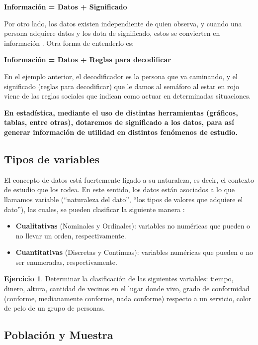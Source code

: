 \documentclass[
  11pt,
]{book}
\providecommand{\tightlist}{%
  \setlength{\itemsep}{0pt}\setlength{\parskip}{0pt}}
\theoremstyle{definition}
\theoremstyle{definition}
\theoremstyle{definition}
\newtheorem{exercise}{Ejercicio}[chapter]
\theoremstyle{definition}
\theoremstyle{remark}
\begin{document}
\textbf{Información = Datos + Significado}

Por otro lado, los datos existen independiente de quien observa, y cuando una persona adquiere datos y los dota de significado, estos se convierten en información \citep{brachman_knowledge_2004}. Otra forma de entenderlo es:

\textbf{Información = Datos + Reglas para decodificar}

En el ejemplo anterior, el decodificador es la persona que va caminando, y el significado (reglas para decodificar) que le damos al semáforo al estar en rojo viene de las reglas sociales que indican como actuar en determinadas situaciones.

\textbf{En estadística, mediante el uso de distintas herramientas (gráficos, tablas, entre otras), dotaremos de significado a los datos, para así generar información de utilidad en distintos fenómenos de estudio.}

\subsection{Tipos de variables}\label{topicos-conceptos-tipos-variables}

El concepto de datos está fuertemente ligado a su naturaleza, es decir, el contexto de estudio que los rodea. En este sentido, los datos están asociados a lo que llamamos variable (``naturaleza del dato'', ``los tipos de valores que adquiere el dato''), las cuales, se pueden clasificar la siguiente manera \citep[página 7]{anderson}:

\begin{itemize}
\tightlist
\item
  \textbf{Cualitativas} (Nominales y Ordinales): variables no numéricas que pueden o no llevar un orden, respectivamente.
\item
  \textbf{Cuantitativas} (Discretas y Continuas): variables numéricas que pueden o no ser enumeradas, respectivamente.
\end{itemize}

\begin{exercise}
Determinar la clasificación de las siguientes variables: tiempo, dinero, altura, cantidad de vecinos en el lugar donde vivo, grado de conformidad (conforme, medianamente conforme, nada conforme) respecto a un servicio, color de pelo de un grupo de personas.
\end{exercise}

\subsection{Población y Muestra}\label{topicos-conceptos-poblacion-muestra}
\end{document}

